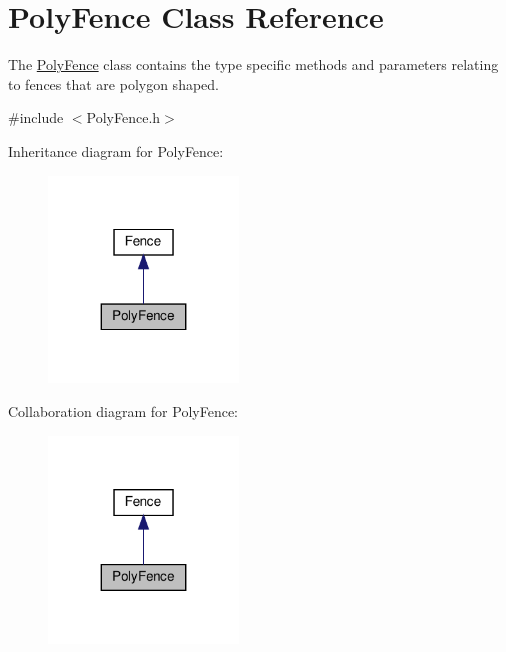 \hypertarget{class_poly_fence}{}\section{Poly\+Fence Class Reference}
\label{class_poly_fence}


The \hyperlink{class_poly_fence}{Poly\+Fence} class contains the type specific methods and parameters relating to fences that are polygon shaped.  




{\ttfamily \#include $<$Poly\+Fence.\+h$>$}



Inheritance diagram for Poly\+Fence\+:
\nopagebreak
\begin{figure}[H]
\begin{center}
\leavevmode
\includegraphics[width=143pt]{d9/ddf/class_poly_fence__inherit__graph}
\end{center}
\end{figure}


Collaboration diagram for Poly\+Fence\+:
\nopagebreak
\begin{figure}[H]
\begin{center}
\leavevmode
\includegraphics[width=143pt]{d2/d10/class_poly_fence__coll__graph}
\end{center}
\end{figure}
